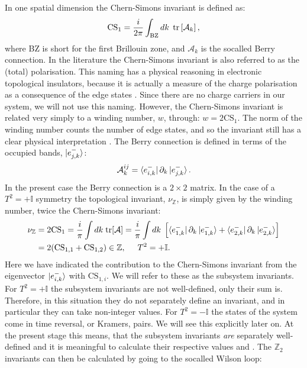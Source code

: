 In one spatial dimension the Chern-Simons invariant is defined as:
\begin{equation}
\text{CS}_1 = \frac{i}{2\pi}\int_{\text{BZ}}dk \; \operatorname{tr}\left[\mathcal{A}_k\right],
\label{eq.definition.CS1}
\end{equation}
where BZ is short for the first Brillouin zone, and $\mathcal{A}_k$ is the socalled Berry connection. In the literature the Chern-Simons invariant is also referred to as the (total) polarisation. This naming has a physical reasoning in electronic topological insulators, because it is actually a measure of the charge polarisation as a consequence of the edge states \cite{FuKane2006}. Since there are no charge carriers in our system, we will not use this naming. However, the Chern-Simons invariant is related very simply to a winding number, $w$, through: $w = 2\text{CS}_1$. The norm of the winding number counts the number of edge states, and so the invariant still has a clear physical interpretation \cite{Chiu.Topology}. The Berry connection is defined in terms of the occupied bands, $\ket{e^{-}_{j,k}}$:
\begin{equation}
\mathcal{A}^{ij}_k = \bra{e^{-}_{i,k}}\partial_k\ket{e^{-}_{j,k}}.
\end{equation}
In the present case the Berry connection is a $2\times 2$ matrix. In the case of a $T^2 = + \mathbb{I}$ symmetry the topological invariant, $\nu_{\mathbb{Z}}$, is simply given by the winding number, twice the Chern-Simons invariant:
\begin{align}
\nu_{\mathbb{Z}} &= 2\text{CS}_1 = \frac{i}{\pi} \int dk\; \text{tr}[\mathcal{A}] = \frac{i}{\pi} \int dk\; \left[\bra{e^{-}_{1,k}}\partial_k\ket{e^{-}_{1,k}} + \bra{e^{-}_{2,k}}\partial_k\ket{e^{-}_{2,k}}  \right] \nonumber \\
 &= 2(\text{CS}_{1,1} + \text{CS}_{1,2})\in \mathbb{Z}, \hspace{0.5cm} T^2 = +\mathbb{I}.
\label{eq.2wires.topinv.T2eqplus1}
\end{align}
Here we have indicated the contribution to the Chern-Simons invariant from the eigenvector $\ket{e^{-}_{i,k}}$ with $\text{CS}_{1,i}$. We will refer to these as the subsystem invariants. For $T^2 = +\mathbb{I}$ the subsystem invariants are not well-defined, only their sum is. Therefore, in this situation they do not separately define an invariant, and in particular they can take non-integer values. For $T^2 = -\mathbb{I}$ the states of the system come in time reversal, or Kramers, pairs. We will see this explicitly later on. At the present stage this means, that the subsystem invariants \textit{are} separately well-defined and it is meaningful to calculate their respective values \cite{FuKane2006, LiYangChen} and \cite[pp. 130-135]{BernevigTITSC}. The $\mathbb{Z}_2$ invariants can then be calculated by going to the socalled Wilson loop:
